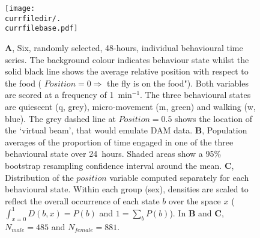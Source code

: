 \begin{figure}[h!]
	\centering   
	\texttt{[image: \\currfiledir/.\\currfilebase.pdf]}
	  \caption[Behavioural state modulation]{
	\textbf{A}, Six, randomly selected, 48-hours, individual behavioural time series.
	The background colour indicates behaviour state whilst the solid black line shows the average relative position with respect to the food (\ie{} $Position = 0  \Longrightarrow$ the fly is on the food").
	Both variables are scored at a frequency of 1~min$^{-1}$. 
	The three behavioural states are quiescent (q, grey), micro-movement (m, green) and walking (w, blue).
	The grey dashed line  at $Position = 0.5$ shows the location of the `virtual beam', that would emulate DAM data.
	\textbf{B}, Population averages of the proportion of time engaged in one of the three behavioural state over 24~hours.
	Shaded areas show a 95\% bootstrap resampling confidence interval around the mean. 
	\textbf{C}, Distribution of the $position$ variable computed separately for each behavioural state.
	Within each group (sex), densities are scaled to reflect
	the overall occurrence of each state $b$ over the space $x$ (\ie{} $\int_{x=0}^{1}D(b,x) = P(b)$ and $1 = \sum_{b} P(b)$).
	In \textbf{B} and \textbf{C}, $N_{male} = 485$ and $N_{female} = 881$.
	\label{fig:\currfilebase}
}
\end{figure}
